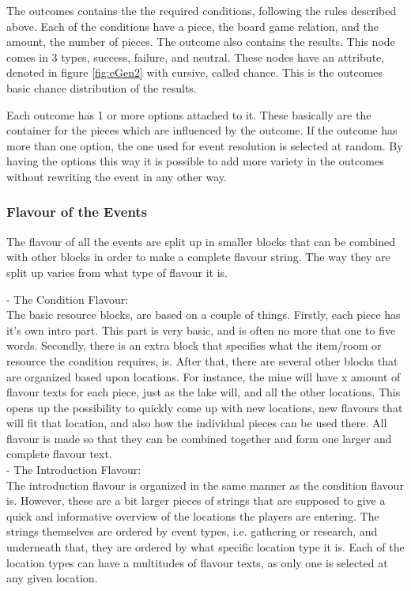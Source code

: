 The outcomes contains the the required conditions, following the rules described above. Each of the conditions have a piece, the board game relation, and the amount, the number of pieces. 
The outcome also contains the results. This node comes in 3 types, success, failure, and neutral. These nodes have an attribute, denoted in figure \ref{fig:eGen2} with cursive, called chance. This is the outcomes basic chance distribution of the results. 

Each outcome has 1 or more options attached to it. These basically are the container for the pieces which are influenced by the outcome. If the outcome has more than one option, the one used for event resolution is selected at random. 
By having the options this way it is possible to add more variety in the outcomes without rewriting the event in any other way.

\subsubsection{Flavour of the Events}


The flavour of all the events are split up in smaller blocks that can be combined with other blocks in order to make a complete flavour string. The way they are split up varies from what type of flavour it is. 

- The Condition Flavour:\\

The basic resource blocks, are based on a couple of things. Firstly, each piece has it's own intro part. This part is very basic, and is often no more that one to five words. Secondly, there is an extra block that specifies what the item/room or resource the condition requires, is. After that, there are several other blocks that are organized based upon locations. For instance, the mine will have x amount of flavour texts for each piece, just as the lake will, and all the other locations. This opens up the possibility to quickly come up with new locations, new flavours that will fit that location, and also how the individual pieces can be used there. All flavour is made so that they can be combined together and form one larger and complete flavour text.\\

- The Introduction Flavour:\\

The introduction flavour is organized in the same manner as the condition flavour is. However, these are a bit larger pieces of strings that are supposed to give a quick and informative overview of the locations the players are entering. The strings themselves are ordered by event types, i.e. gathering or research, and underneath that, they are ordered by what specific location type it is. Each of the location types can have a multitudes of flavour texts, as only one is selected at any given location.\\

